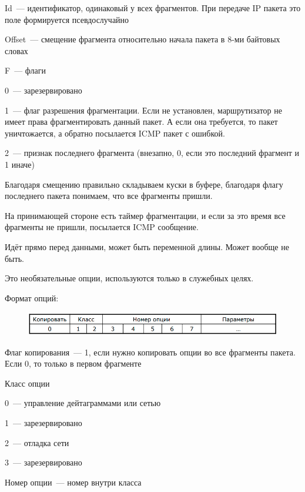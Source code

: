 \begin{MyItemize}
    \item Id~--- идентификатор, одинаковый у всех фрагментов. При передаче IP пакета это поле формируется псевдослучайно
    \item Offset~--- смещение фрагмента относительно начала пакета в 8-ми байтовых словах
    \item F~--- флаги
    \begin{MyItemize}
        \item 0~--- зарезервировано
        \item 1~--- флаг разрешения фрагментации. Если не установлен, маршрутизатор не имеет права фрагментировать данный пакет. А если она требуется, то пакет уничтожается, а обратно посылается ICMP пакет с ошибкой.
        \item 2~--- признак последнего фрагмента (внезапно, 0, если это последний фрагмент и 1 иначе)
    \end{MyItemize}

    Благодаря смещению правильно складываем куски в буфере, благодаря флагу последнего пакета понимаем, что все фрагменты пришли.

    На принимающей стороне есть таймер фрагментации, и если за это время все фрагменты не пришли, посылается ICMP сообщение.
\end{MyItemize}


Идёт прямо перед данными, может быть переменной длины. Может вообще не быть.

Это необязательные опции, используются только в служебных целях.

Формат опций:

\begin{figure}[H]
  \centering
  \includegraphics[width=15cm]{images/02/04}
\end{figure}

\begin{MyItemize}
    \item Флаг копирования~--- 1, если нужно копировать опции во все фрагменты пакета. Если 0, то только в первом фрагменте
    \item Класс опции
    \begin{MyItemize}
        \item 0~--- управление дейтаграммами или сетью
        \item 1~--- зарезервировано
        \item 2~--- отладка сети
        \item 3~--- зарезервировано
    \end{MyItemize}
    \item Номер опции~--- номер внутри класса
\end{MyItemize}

